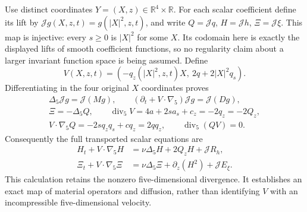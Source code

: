 Use distinct coordinates \(Y=(X,z)\in\mathbb R^4\times\mathbb R\).
For each scalar coefficient define its lift by
\(\mathcal Jg(X,z,t)=g(|X|^2,z,t)\), and write
\(Q=\mathcal Jq\), \(H=\mathcal Jh\), \(\Xi=\mathcal J\xi\).
This map is injective: every \(s\geq0\) is \(|X|^2\) for some
\(X\).  Its codomain here is exactly the displayed lifts of smooth
coefficient functions, so no regularity claim about a larger invariant
function space is being assumed.  Define
\begin{equation}\label{eq:aft-five-vector}
 V(X,z,t)=(-q_z(|X|^2,z,t)X,\ 2q+2|X|^2q_s).
\end{equation}
Differentiating in the four original \(X\) coordinates proves
\begin{equation}\label{eq:aft-five-intertwining}
 \begin{gathered}
 \Delta_5\mathcal Jg=\mathcal J(Mg),\qquad
 (\partial_t+V\cdot\nabla_5)\mathcal Jg=\mathcal J(Dg),\\
 \Xi=-\Delta_5Q,\qquad
 \operatorname{div}_5 V=4a+2s a_s+c_z=-2q_z=-2Q_z,\\
 V\cdot\nabla_5Q=-2s q_zq_s+cq_z=2q q_z,
 \qquad \operatorname{div}_5(QV)=0.
 \end{gathered}
\end{equation}
Consequently the full transported scalar equations are
\begin{equation}\label{eq:aft-five-pde}
 \begin{split}
 H_t+V\cdot\nabla_5H&=\nu\Delta_5H+2Q_zH+\mathcal J R_h,\\
 \Xi_t+V\cdot\nabla_5\Xi
   &=\nu\Delta_5\Xi+\partial_z(H^2)+\mathcal J E_\xi.
 \end{split}
\end{equation}
This calculation retains the nonzero five-dimensional divergence.
It establishes an exact map of material operators and diffusion, rather
than identifying \(V\) with an incompressible five-dimensional velocity.

